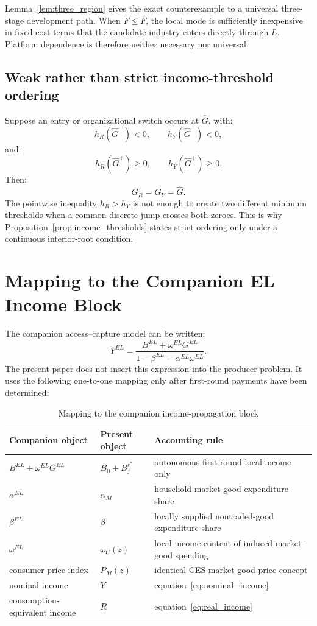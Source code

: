 Lemma~\ref{lem:three_region} gives the exact counterexample to a universal
three-stage development path.  When \(F\leq\bar F\), the local mode is
sufficiently inexpensive in fixed-cost terms that the candidate industry
enters directly through \(L\).  Platform dependence is therefore neither
necessary nor universal.

\subsection{Weak rather than strict income-threshold ordering}

Suppose an entry or organizational switch occurs at \(\widehat G\), with:
\[
h_R(\widehat G^-)<0,\qquad h_Y(\widehat G^-)<0,
\]
and:
\[
h_R(\widehat G^+)\geq0,\qquad h_Y(\widehat G^+)\geq0.
\]
Then:
\[
G_R=G_Y=\widehat G.
\]
The pointwise inequality \(h_R>h_Y\) is not enough to create two different
minimum thresholds when a common discrete jump crosses both zeroes.  This is
why Proposition~\ref{prop:income_thresholds} states strict ordering only under
a continuous interior-root condition.

\section{Mapping to the Companion EL Income Block}

The companion access--capture model can be written:
\[
Y^{EL}
=
\frac{B^{EL}+\omega^{EL}G^{EL}}
{1-\beta^{EL}-\alpha^{EL}\omega^{EL}}.
\]
The present paper does not insert this expression into the producer problem.
It uses the following one-to-one mapping only after first-round payments have
been determined:

\begin{table}[htbp]
\centering
\caption{Mapping to the companion income-propagation block}
\begin{tabular}{p{}p{}p{}}
\toprule
Companion object & Present object & Accounting rule\\
\midrule
\(B^{EL}+\omega^{EL}G^{EL}\)
& \(B_0+B_j^{r^*}\)
& autonomous first-round local income only\\
\(\alpha^{EL}\)
& \(\alpha_M\)
& household market-good expenditure share\\
\(\beta^{EL}\)
& \(\beta\)
& locally supplied nontraded-good expenditure share\\
\(\omega^{EL}\)
& \(\omega_C(z)\)
& local income content of induced market-good spending\\
consumer price index
& \(P_M(z)\)
& identical CES market-good price concept\\
nominal income
& \(Y\)
& equation~\eqref{eq:nominal_income}\\
consumption-equivalent income
& \(R\)
& equation~\eqref{eq:real_income}\\
\bottomrule
\end{tabular}
\end{table}

